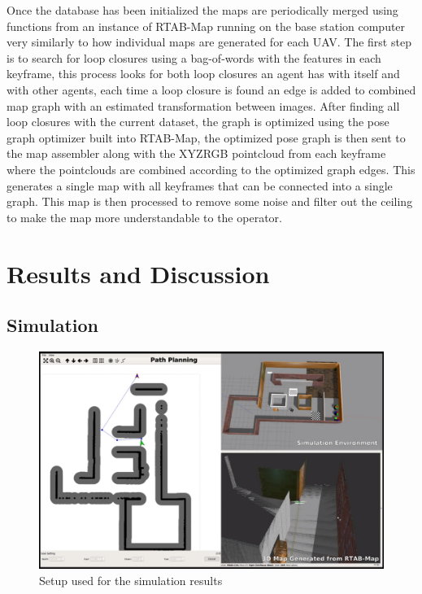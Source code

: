 \documentclass[letterpaper, 10 pt, conference]{ieeeconf}  %
\begin{document}
Once the database has been initialized the maps are periodically merged using functions from an instance of RTAB-Map running on the base station computer very similarly to how individual maps are generated for each UAV. The first step is to search for loop closures using a bag-of-words with the features in each keyframe, this process looks for both loop closures an agent has with itself and with other agents, each time a loop closure is found an edge is added to combined map graph with an estimated transformation between images. After finding all loop closures with the current dataset, the graph is optimized using the pose graph optimizer built into RTAB-Map, the optimized pose graph is then sent to the map assembler along with the XYZRGB pointcloud from each keyframe where the pointclouds are combined according to the optimized graph edges. This generates a single map with all keyframes that can be connected into a single graph. This map is then processed to remove some noise and filter out the ceiling to make the map more understandable to the operator.
\section{Results and Discussion}\label{results}

\subsection{Simulation}

\begin{figure}
\centering
\includegraphics[width=1.0\linewidth]{sim_setup}
\caption{Setup used for the simulation results}
\label{fig:sim_setup}
\end{figure}
\end{document}
